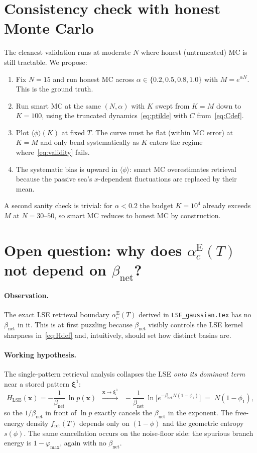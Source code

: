 \documentclass[11pt]{article}
\newcommand{\bxi}{\boldsymbol{\xi}}
\newcommand{\bx}{\mathbf{x}}
\newcommand{\avg}[1]{\langle #1 \rangle}
\begin{document}
\section{Consistency check with honest Monte Carlo}

The cleanest validation runs at moderate $N$ where honest (untruncated) MC is still tractable. We propose:
\begin{enumerate}
\item Fix $N\!=\!15$ and run honest MC across $\alpha\in\{0.2,0.5,0.8,1.0\}$ with $M = e^{\alpha N}$. This is the ground truth.
\item Run smart MC at the same $(N,\alpha)$ with $K$ swept from $K\!=\!M$ down to $K\!=\!100$, using the truncated dynamics~\eqref{eq:ptilde} with $C$ from~\eqref{eq:Cdef}.
\item Plot $\avg{\phi}(K)$ at fixed $T$. The curve must be flat (within MC error) at $K\!=\!M$ and only bend systematically as $K$ enters the regime where~\eqref{eq:validity} fails.
\item The systematic bias is upward in $\avg{\phi}$: smart MC overestimates retrieval because the passive sea's $x$-dependent fluctuations are replaced by their mean.
\end{enumerate}
A second sanity check is trivial: for $\alpha<0.2$ the budget $K=10^4$ already exceeds $M$ at $N\!=\!30$--$50$, so smart MC reduces to honest MC by construction.

\section{Open question: why does $\alpha_c^{\mathrm E}(T)$ not depend on $\beta_{\mathrm{net}}$?}

\paragraph{Observation.} The exact LSE retrieval boundary $\alpha_c^{\mathrm E}(T)$ derived in {\tt LSE\_gaussian.tex} has no $\beta_{\mathrm{net}}$ in it. This is at first puzzling because $\beta_{\mathrm{net}}$ visibly controls the LSE kernel sharpness in~\eqref{eq:Hdef} and, intuitively, should set how distinct basins are.

\paragraph{Working hypothesis.} The single-pattern retrieval analysis collapses the LSE \emph{onto its dominant term} near a stored pattern $\bxi^1$:
\begin{equation}
H_{\mathrm{LSE}}(\bx) = -\frac{1}{\beta_{\mathrm{net}}}\,\ln p(\bx)
\;\;\overset{\bx\to\bxi^1}{\longrightarrow}\;\;
-\frac{1}{\beta_{\mathrm{net}}}\,\ln\!\big[e^{-\beta_{\mathrm{net}} N(1-\phi_1)}\big]
\;=\;N(1-\phi_1),
\end{equation}
so the $1/\beta_{\mathrm{net}}$ in front of $\ln p$ exactly cancels the $\beta_{\mathrm{net}}$ in the exponent. The free-energy density $f_{\mathrm{ret}}(T)$ depends only on $(1-\phi)$ and the geometric entropy $s(\phi)$. The same cancellation occurs on the noise-floor side: the spurious branch energy is $1-\varphi_{\max}$, again with no $\beta_{\mathrm{net}}$.
\end{document}
